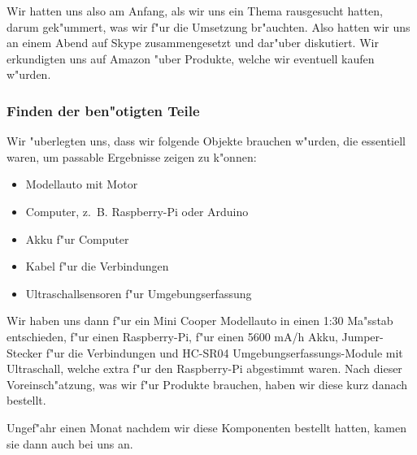 \documentclass[a4paper,12pt]{article}
\newenvironment{myitemize}{
	\begin{itemize}
		\setlength{\itemsep}{0pt}
		\setlength{\parskip}{0pt}
		\setlength{\parsep}{0pt}
}
{
	\end{itemize}
}
\begin{document}
Wir hatten uns also am Anfang, als wir uns ein Thema rausgesucht hatten, darum gek"ummert, was wir f"ur die Umsetzung br"auchten.
Also hatten wir uns an einem Abend auf Skype zusammengesetzt und dar"uber diskutiert.
Wir erkundigten uns auf Amazon "uber Produkte, welche wir eventuell kaufen w"urden.

\subsubsection{Finden der ben"otigten Teile}\label{sec2.1.1}

Wir "uberlegten uns, dass wir folgende Objekte brauchen w"urden, die essentiell waren, um passable Ergebnisse zeigen zu k"onnen:

\begin{myitemize}
	\item Modellauto mit Motor
	\item Computer, z.~B. Raspberry-Pi oder Arduino
	\item Akku f"ur Computer
	\item Kabel f"ur die Verbindungen
	\item Ultraschallsensoren f"ur Umgebungserfassung
\end{myitemize}

Wir haben uns dann f"ur ein Mini Cooper Modellauto in einen 1:30 Ma"sstab entschieden, f"ur einen Raspberry-Pi, f"ur einen 5600 mA/h Akku, Jumper-Stecker f"ur die Verbindungen und HC-SR04 Umgebungserfassungs-Module mit Ultraschall, welche extra f"ur den Raspberry-Pi abgestimmt waren.
Nach dieser Voreinsch"atzung, was wir f"ur Produkte brauchen, haben wir diese kurz danach bestellt.

Ungef"ahr einen Monat nachdem wir diese Komponenten bestellt hatten, kamen sie dann auch bei uns an. 
\end{document}
